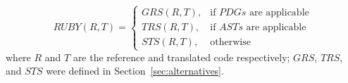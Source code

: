 $$
RUBY(R, T) = \begin{cases}
				GRS(R, T), 	& \mbox{if } PDGs\mbox{ are applicable} \\
				TRS(R, T), 	& \mbox{if } ASTs\mbox{ are applicable} \\
				STS(R, T), 	& \mbox{otherwise}
			\end{cases}
$$
where $R$ and $T$ are the reference and translated code respectively;
$GRS$, $TRS$, and $STS$ were defined in Section~\ref{sec:alternatives}.







